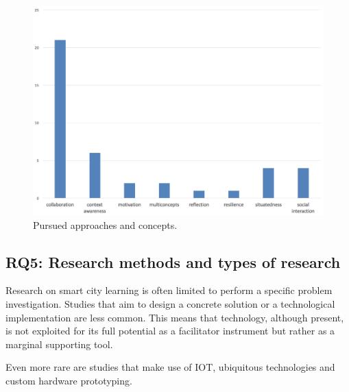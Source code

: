 \begin{figure}[htb]
\centering
\includegraphics[width=12cm]{img/approaches}
\caption{Pursued approaches and concepts.}
\label{fig:approaches}
\end{figure}


\subsection*{RQ5: Research methods and types of research}
Research on smart city learning is often limited to perform a specific problem investigation.
Studies that aim to design a concrete solution or a technological implementation are less common.
This means that technology, although present, is not exploited for its full potential as a facilitator instrument but rather as a marginal supporting tool.

Even more rare are studies that make use of IOT, ubiquitous technologies and custom hardware prototyping.